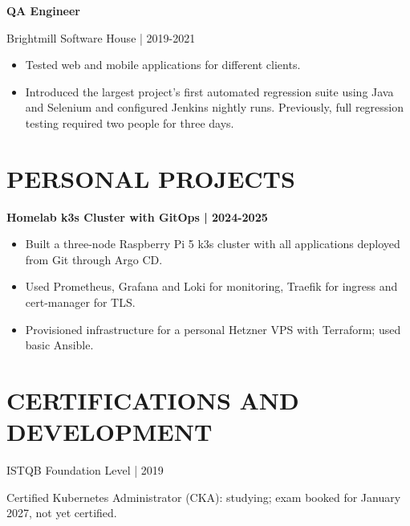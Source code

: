 \documentclass[11pt,a4paper]{article}
\newcommand{\cvsection}[1]{\section*{#1}}
\begin{document}
\textbf{QA Engineer}\par
Brightmill Software House | 2019-2021
\begin{itemize}
\item Tested web and mobile applications for different clients.
\item Introduced the largest project's first automated regression suite using Java and Selenium and configured Jenkins nightly runs. Previously, full regression testing required two people for three days.
\end{itemize}

\cvsection{PERSONAL PROJECTS}
\textbf{Homelab k3s Cluster with GitOps | 2024-2025}
\begin{itemize}
\item Built a three-node Raspberry Pi 5 k3s cluster with all applications deployed from Git through Argo CD.
\item Used Prometheus, Grafana and Loki for monitoring, Traefik for ingress and cert-manager for TLS.
\item Provisioned infrastructure for a personal Hetzner VPS with Terraform; used basic Ansible.
\end{itemize}

\cvsection{CERTIFICATIONS AND DEVELOPMENT}
ISTQB Foundation Level | 2019\par
Certified Kubernetes Administrator (CKA): studying; exam booked for January 2027, not yet certified.
\end{document}
